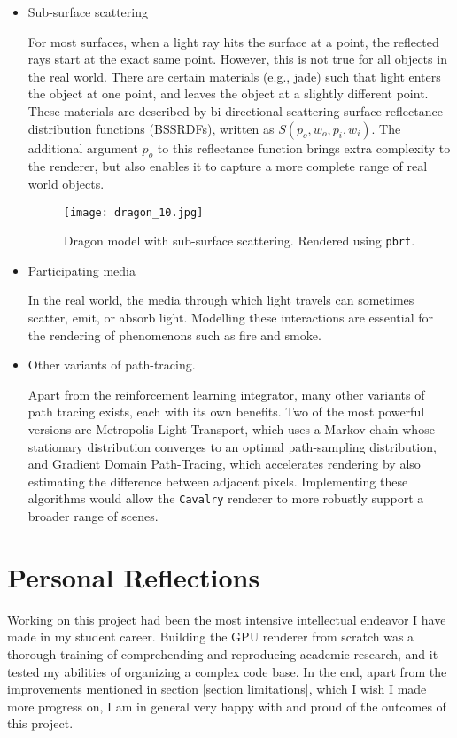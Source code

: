 \begin{itemize}

    \item Sub-surface scattering
    
    For most surfaces, when a light ray hits the surface at a point, the reflected rays start at the exact same point. However, this is not true for all objects in the real world. There are certain materials (e.g., jade) such that light enters the object at one point, and leaves the object at a slightly different point. These materials are described by bi-directional scattering-surface reflectance distribution functions (BSSRDFs), written as $S(p_o,w_o,p_i,w_i)$. The additional argument $p_o$ to this reflectance function brings extra complexity to the renderer, but also enables it to capture a more complete range of real world objects.

    \begin{figure}[H]
        \centering
        \texttt{[image: dragon\_10.jpg]}
        \caption{Dragon model with sub-surface scattering. Rendered using \texttt{pbrt}.}
    \end{figure}

    \item Participating media
    
    In the real world, the media through which light travels can sometimes scatter, emit, or absorb light. Modelling these interactions are essential for the rendering of phenomenons such as fire and smoke. 

    

    \item Other variants of path-tracing.
    
    Apart from the reinforcement learning integrator, many other variants of path tracing exists, each with its own benefits. Two of the most powerful versions are Metropolis Light Transport, which uses a Markov chain whose stationary distribution converges to an optimal path-sampling distribution, and Gradient Domain Path-Tracing, which accelerates rendering by also estimating the difference between adjacent pixels. Implementing these algorithms would allow the \texttt{Cavalry} renderer to more robustly support a broader range of scenes.


\end{itemize}



\section{Personal Reflections}
Working on this project had been the most intensive intellectual endeavor I have made in my student career. Building the GPU renderer from scratch was a thorough training of comprehending and reproducing academic research, and it tested my abilities of organizing a complex code base. In the end, apart from the improvements mentioned in section \ref{section limitations}, which I wish I made more progress on, I am in general very happy with and proud of the outcomes of this project.


